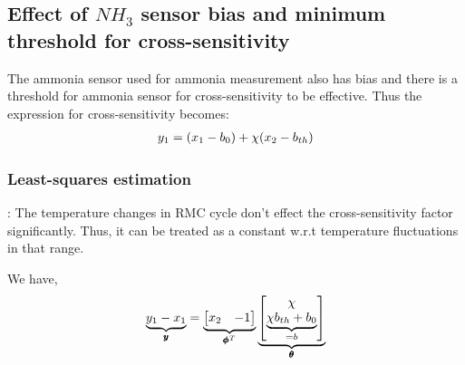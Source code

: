 \subsection{Effect of $NH_3$ sensor bias and minimum threshold for cross-sensitivity}

The ammonia sensor used for ammonia measurement also has bias and there is a
threshold for ammonia sensor for cross-sensitivity to be effective. Thus the
expression for cross-sensitivity becomes:
\begin{align*}
    y_1 &= \left( x_1 - b_0 \right) + \chi (x_2 - b_{th})\\
\end{align*}

\subsubsection{Least-squares estimation}
: The temperature changes in RMC cycle don't effect the
cross-sensitivity factor significantly. Thus, it can be treated as a constant
w.r.t temperature fluctuations in that range.

We have,
\begin{align*}
    \underbrace{y_1 - x_1}_{\pmb y} &= \underbrace{\begin{bmatrix} x_2 & -1 \end{bmatrix}}_{\pmb \phi^T} \underbrace{\begin{bmatrix}  \chi \\ \underbrace{\chi b_{th} + b_0}_{=b} \end{bmatrix}}_{ \pmb \theta}\\
\end{align*}

